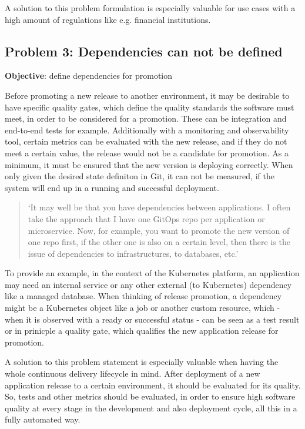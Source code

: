A solution to this problem formulation is especially valuable for
use cases with a high amount of regulations like e.g. financial institutions.

\subsection{Problem 3: Dependencies can not be defined}

\textbf{Objective}: define dependencies for promotion

Before promoting a new release to another environment,
it may be desirable to have specific
quality gates, which define the quality standards the
software must meet, in order to be considered for a promotion.
These can be integration and end-to-end tests for example.
Additionally with a monitoring and observability tool,
certain metrics can be evaluated with the new release,
and if they do not meet a certain value, the release would not
be a candidate for promotion.
As a minimum, it must be ensured that the new version is 
deploying correctly. When only given the desired state definiton
in Git, it can not be measured, if the system will end up in a running
and successful deployment.

\begin{quotation}
	\noindent
	\enquote*{It may well be that you have dependencies between applications. I often take the approach that I have one GitOps repo per application or microservice. Now, for example, you want to promote the new version of one repo first, if the other one is also on a certain level, then there is the issue of dependencies to infrastructures, to databases, etc.}
\end{quotation}

To provide an example, in the context of the Kubernetes platform,
an application may need an internal service or any other external (to Kubernetes)
dependency like a managed database.
When thinking of release promotion,
a dependency might be a Kubernetes object like a job or another custom resource,
which - when it is observed with a ready or successful status -
can be seen as a test result or in prinicple a quality gate, which qualifies the
new application release for promotion.

A solution to this problem statement is especially valuable when having the whole
continuous delivery lifecycle in mind. After deployment of a new application release
to a certain environment, it should be evaluated for its quality. So, tests
and other metrics should be evaluated, in order to ensure high software quality
at every stage in the development and also deployment cycle,
all this in a fully automated way.


